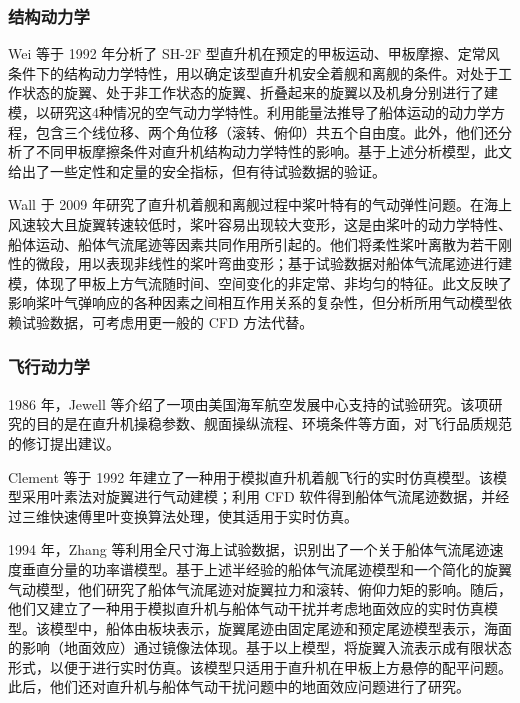 \subsubsection{结构动力学}

Wei 等于 1992 年分析了 SH-2F 型直升机在预定的甲板运动、甲板摩擦、定常风条件下的结构动力学特性，用以确定该型直升机安全着舰和离舰的条件。对处于工作状态的旋翼、处于非工作状态的旋翼、折叠起来的旋翼以及机身分别进行了建模，以研究这4种情况的空气动力学特性。利用能量法推导了船体运动的动力学方程，包含三个线位移、两个角位移（滚转、俯仰）共五个自由度。此外，他们还分析了不同甲板摩擦条件对直升机结构动力学特性的影响。基于上述分析模型，此文给出了一些定性和定量的安全指标，但有待试验数据的验证。

Wall 于 2009 年研究了直升机着舰和离舰过程中桨叶特有的气动弹性问题。在海上风速较大且旋翼转速较低时，桨叶容易出现较大变形，这是由桨叶的动力学特性、船体运动、船体气流尾迹等因素共同作用所引起的。他们将柔性桨叶离散为若干刚性的微段，用以表现非线性的桨叶弯曲变形；基于试验数据对船体气流尾迹进行建模，体现了甲板上方气流随时间、空间变化的非定常、非均匀的特征。此文反映了影响桨叶气弹响应的各种因素之间相互作用关系的复杂性，但分析所用气动模型依赖试验数据，可考虑用更一般的
CFD 方法代替。

\subsubsection{飞行动力学}

1986 年，Jewell 等介绍了一项由美国海军航空发展中心支持的试验研究。该项研究的目的是在直升机操稳参数、舰面操纵流程、环境条件等方面，对飞行品质规范的修订提出建议。

Clement 等于 1992 年建立了一种用于模拟直升机着舰飞行的实时仿真模型。该模型采用叶素法对旋翼进行气动建模；利用
CFD 软件得到船体气流尾迹数据，并经过三维快速傅里叶变换算法处理，使其适用于实时仿真。

1994 年，Zhang 等利用全尺寸海上试验数据，识别出了一个关于船体气流尾迹速度垂直分量的功率谱模型。基于上述半经验的船体气流尾迹模型和一个简化的旋翼气动模型，他们研究了船体气流尾迹对旋翼拉力和滚转、俯仰力矩的影响。随后，他们又建立了一种用于模拟直升机与船体气动干扰并考虑地面效应的实时仿真模型。该模型中，船体由板块表示，旋翼尾迹由固定尾迹和预定尾迹模型表示，海面的影响（地面效应）通过镜像法体现。基于以上模型，将旋翼入流表示成有限状态形式，以便于进行实时仿真。该模型只适用于直升机在甲板上方悬停的配平问题。此后，他们还对直升机与船体气动干扰问题中的地面效应问题进行了研究。

